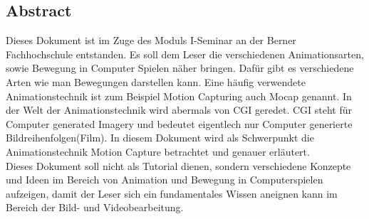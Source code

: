 \subsection*{Abstract}

Dieses Dokument ist im Zuge des Moduls I-Seminar an der Berner
Fachhochschule entstanden. Es soll dem Leser die verschiedenen Animationsarten, sowie Bewegung in Computer Spielen näher bringen. Dafür gibt es verschiedene Arten wie man Bewegungen darstellen kann. Eine häufig verwendete Animationstechnik ist zum Beispiel Motion Capturing auch Mocap genannt. In der Welt der Animationstechnik wird abermals von CGI geredet. CGI steht für Computer generated Imagery und bedeutet eigentlech nur Computer generierte Bildreihenfolgen(Film). In diesem Dokument wird als Schwerpunkt die Animationstechnik Motion Capture betrachtet und genauer erläutert.\\

Dieses Dokument soll nicht als Tutorial dienen, sondern
verschiedene Konzepte und Ideen im Bereich von Animation und Bewegung in Computerspielen aufzeigen, damit der Leser
sich ein fundamentales Wissen aneignen kann im Bereich der Bild- und Videobearbeitung.
